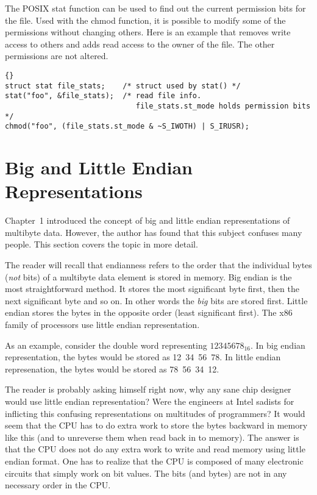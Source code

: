 The POSIX {\code stat} function can be used to find out the current 
permission bits for the file. Used with the {\code chmod} function, it
is possible to modify some of the permissions without changing others.
Here is an example that removes write access to others and adds read
access to the owner of the file. The other permissions are not altered.
\begin{lstlisting}{}
struct stat file_stats;    /* struct used by stat() */
stat("foo", &file_stats);  /* read file info. 
                              file_stats.st_mode holds permission bits */
chmod("foo", (file_stats.st_mode & ~S_IWOTH) | S_IRUSR);
\end{lstlisting}

\section{Big and Little Endian Representations}

Chapter~1 introduced the concept of big and little endian
representations of multibyte data. However, the author has found
that this subject confuses many people. This section covers the
topic in more detail. 

The reader will recall that endianness refers to the order that the
individual bytes (\emph{not} bits) of a multibyte data element is
stored in memory. Big endian is the most straightforward method. It
stores the most significant byte first, then the next significant byte
and so on. In other words the \emph{big} bits are stored first. Little
endian stores the bytes in the opposite order (least significant first).
The x86 family of processors use little endian representation.

As an example, consider the double word representing $12345678_{16}$. In
big endian representation, the bytes would be stored as 12~34~56~78. In
little endian represenation, the bytes would be stored as 78~56~34~12.

The reader is probably asking himself right now, why any sane chip
designer would use little endian representation? Were the engineers at
Intel sadists for inflicting this confusing representations on
multitudes of programmers? It would seem that the CPU has to do extra
work to store the bytes backward in memory like this (and to unreverse
them when read back in to memory). The answer is that the CPU does not
do any extra work to write and read memory using little endian format.
One has to realize that the CPU is composed of many electronic
circuits that simply work on bit values. The bits (and bytes) are not
in any necessary order in the CPU.

